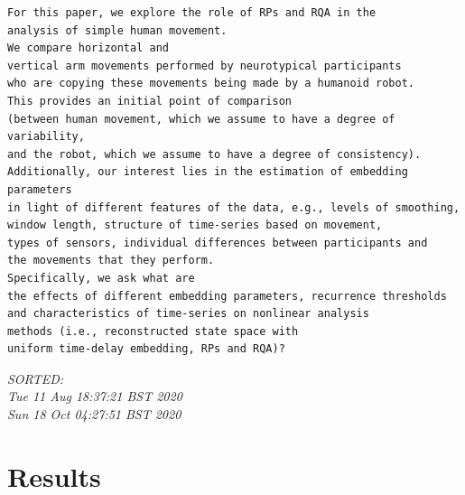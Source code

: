 \documentclass[10pt]{article}
\begin{document}
\begin{verbatim}
For this paper, we explore the role of RPs and RQA in the 
analysis of simple human movement. 
We compare horizontal and 
vertical arm movements performed by neurotypical participants 
who are copying these movements being made by a humanoid robot.  
This provides an initial point of comparison 
(between human movement, which we assume to have a degree of variability, 
and the robot, which we assume to have a degree of consistency).   
Additionally, our interest lies in the estimation of embedding parameters 
in light of different features of the data, e.g., levels of smoothing, 
window length, structure of time-series based on movement, 
types of sensors, individual differences between participants and 
the movements that they perform. 
Specifically, we ask what are 
the effects of different embedding parameters, recurrence thresholds 
and characteristics of time-series on nonlinear analysis 
methods (i.e., reconstructed state space with 
uniform time-delay embedding, RPs and RQA)?

\end{verbatim}


\textit{
SORTED: \\ 
Tue 11 Aug 18:37:21 BST 2020 \\
Sun 18 Oct 04:27:51 BST 2020
\\
}



\section{Results}
\end{document}
